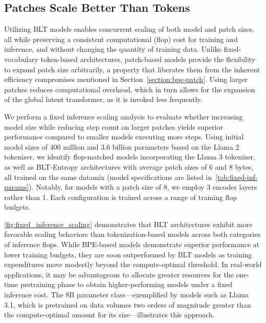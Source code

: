 \subsection{Patches Scale Better Than Tokens} Utilizing {\textsc BLT} models enables concurrent scaling of both model and patch sizes, all while preserving a consistent computational (flop) cost for training and inference, and without changing the quantity of training data. Unlike fixed-vocabulary token-based architectures, patch-based models provide the flexibility to expand patch size arbitrarily, a property that liberates them from the inherent efficiency compromises mentioned in Section~\ref{section:bpe-patch}. Using larger patches reduces computational overhead, which in turn allows for the expansion of the global latent transformer, as it is invoked less frequently.

We perform a fixed inference scaling analysis to evaluate whether increasing model size while reducing step count on larger patches yields superior performance compared to smaller models executing more steps. Using initial model sizes of 400 million and 3.6 billion parameters based on the Llama 2 tokenizer, we identify flop-matched models incorporating the Llama 3 tokenizer, as well as {\textsc BLT}-Entropy architectures with average patch sizes of 6 and 8 bytes, all trained on the same datamix (model specifications are listed in~\autoref{tab:fixed-inf-params}). Notably, for models with a patch size of 8, we employ 3 encoder layers rather than 1. Each configuration is trained across a range of training flop budgets.

\autoref{fig:fixed_inference_scaling} demonstrates that {\textsc BLT} architectures exhibit more favorable scaling behaviors than tokenization-based models across both categories of inference flops. While BPE-based models demonstrate superior performance at lower training budgets, they are soon outperformed by {\textsc BLT} models as training expenditures move modestly beyond the compute-optimal threshold. In real-world applications, it may be advantageous to allocate greater resources for the one-time pretraining phase to obtain higher-performing models under a fixed inference cost. The 8B parameter class—exemplified by models such as Llama 3.1, which is pretrained on data volumes two orders of magnitude greater than the compute-optimal amount for its size—illustrates this approach.

